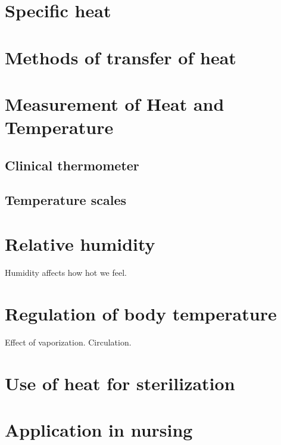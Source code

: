 \documentclass[12pt]{book}
\begin{document}
\section{Specific heat}

\section{Methods of transfer of heat}
\section{Measurement of Heat and Temperature}
\subsection{Clinical thermometer}
\subsection{Temperature scales}
\section{Relative humidity}
Humidity affects how hot we feel. 
\section{Regulation of body temperature}
Effect of vaporization.
Circulation.

\section{Use of heat for sterilization}
\section{Application in nursing}
\end{document}
